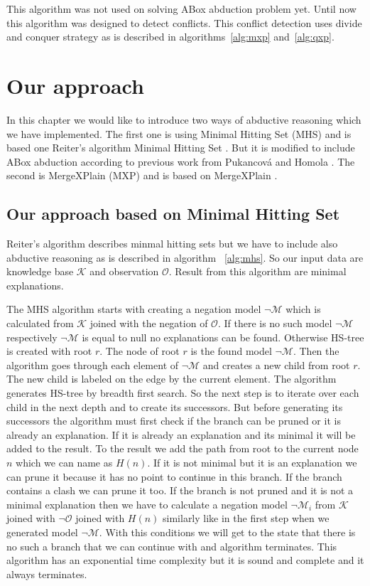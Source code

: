 \documentclass[12pt,a4paper]{article}
\begin{document}
This algorithm was not used on solving ABox abduction problem yet. Until now this algorithm was designed to detect conflicts. This conflict detection uses divide and conquer strategy as is described in algorithms~\ref{alg:mxp} and~\ref{alg:qxp}.

\section{Our approach}
In this chapter we would like to introduce two ways of abductive reasoning which we have implemented. The first one is using Minimal Hitting Set (MHS) and is based one Reiter's algorithm Minimal Hitting Set \citep{reiterHS}. But it is modified to include ABox abduction according to previous work from Pukancová and Homola \citep{pukancovaPreliminaryReport}. The second is MergeXPlain (MXP) and is based on MergeXPlain \citep{MXP}.

\subsection{Our approach based on Minimal Hitting Set}
Reiter's algorithm describes minmal hitting sets but we have to include also abductive reasoning as is described in algorithm ~\ref{alg:mhs}. So our input data are knowledge base $\mathcal{K}$ and observation $\mathcal{O}$. Result from this algorithm are minimal explanations.

The MHS algorithm starts with creating a negation model $\neg \mathcal{M}$ which is calculated from $\mathcal{K}$ joined with the negation of $\mathcal{O}$. If there is no such model $\neg \mathcal{M}$ respectively $\neg \mathcal{M}$ is equal to null no explanations can be found. Otherwise HS-tree is created with root $r$. The node of root $r$ is the found model $\neg \mathcal{M}$. Then the algorithm goes through each element of $\neg \mathcal{M}$ and creates a new child from root $r$. The new child is labeled on the edge by the current element. The algorithm generates HS-tree by breadth first search. So the next step is to iterate over each child in the next depth and to create its successors. But before generating its successors the algorithm must first check if the branch can be pruned or it is already an explanation. If it is already an explanation and its minimal it will be added to the result. To the result we add the path from root to the current node $n$ which we can name as $H(n)$. If it is not minimal but it is an explanation we can prune it because it has no point to continue in this branch. If the branch contains a clash we can prune it too. If the branch is not pruned and it is not a minimal explanation then we have to calculate a negation model $\neg \mathcal{M}_{i}$ from $\mathcal{K}$ joined with $\neg \mathcal{O}$ joined with $H(n)$ similarly like in the first step when we generated model $\neg \mathcal{M}$. With this conditions we will get to the state that there is no such a branch that we can continue with and algorithm terminates. This algorithm has an exponential time complexity but it is sound and complete and it always terminates.
\end{document}
